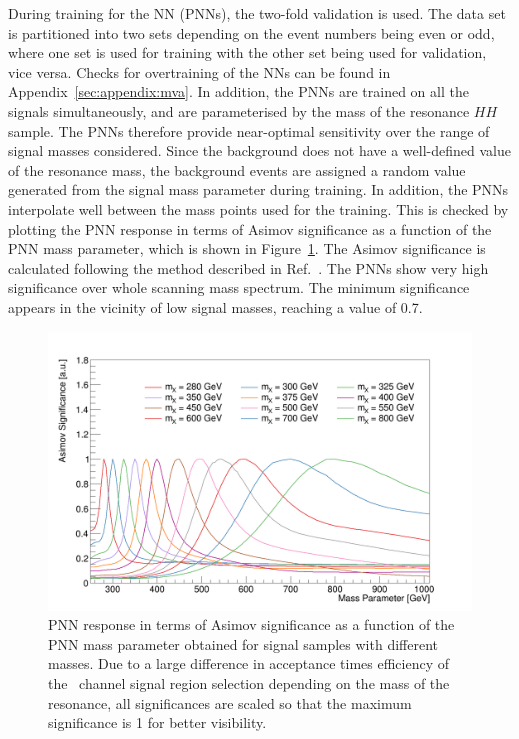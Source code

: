 During training for the NN (PNNs), the two-fold validation is used. 
The data set is partitioned into two sets depending on 
the event numbers being even or odd, where one set is used for
training with the other set being used for validation, vice versa.
Checks for overtraining of the NNs can be found in Appendix~\ref{sec:appendix:mva}.
In addition, the PNNs are trained on all the signals simultaneously, 
and are parameterised by the mass of the resonance $HH$ sample. 
The PNNs therefore provide near-optimal sensitivity over the
range of signal masses considered. 
Since the background does not have a well-defined value of the
resonance mass, the background events are assigned a random value
generated from the signal mass parameter during training. 
In addition, the PNNs interpolate well between the mass points used for the training.
This is checked by plotting the PNN response in terms of Asimov significance
as a function of the PNN mass parameter, which is shown in Figure~\ref{fig:MVA:mass-response}. 
The Asimov significance is calculated following the method described in Ref.~\cite{Glen-Cowan}.
The PNNs show very high significance over whole scanning mass spectrum. 
The minimum significance appears in the vicinity of low signal masses, reaching a 
value of 0.7. 



\begin{figure}[htbp]
\centering
\includegraphics[width=0.85\linewidth]{DiHiggs/plots/mass_response.png}
\caption{
    PNN response in terms of Asimov significance as a function of the PNN mass parameter obtained for
signal samples with different masses. Due to a large difference in acceptance times
efficiency of the \lephad\ channel signal region selection depending on the mass of the resonance, 
all significances are scaled so that the maximum significance is 1 for better visibility.}
\label{fig:MVA:mass-response}
\end{figure}



